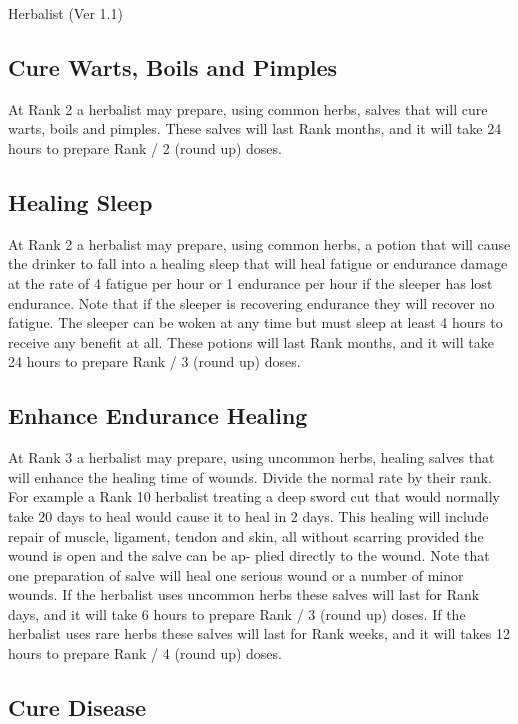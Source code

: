 \begin{Chapter}{Herbalist (Ver 1.1)}
\subsection{Cure Warts, Boils and Pimples}

At Rank 2 a herbalist may prepare, using common herbs, salves that
will cure warts, boils and pimples.  These salves will last Rank
months, and it will take 24 hours to prepare Rank / 2 (round up)
doses.

\subsection{Healing Sleep}

At Rank 2 a herbalist may prepare, using common herbs, a potion that
will cause the drinker to fall into a healing sleep that will heal
fatigue or endurance damage at the rate of 4 fatigue per hour or 1
endurance per hour if the sleeper has lost endurance.  Note that if
the sleeper is recovering endurance they will recover no fatigue.  The
sleeper can be woken at any time but must sleep at least 4 hours to
receive any benefit at all.  These potions will last Rank months, and
it will take 24 hours to prepare Rank / 3 (round up) doses.

\subsection{Enhance Endurance Healing}

At Rank 3 a herbalist may prepare, using uncommon herbs, healing
salves that will enhance the healing time of wounds. Divide the normal
rate by their rank.  For example a Rank 10 herbalist treating a deep
sword cut that would normally take 20 days to heal would cause it to
heal in 2 days.  This healing will include repair of muscle, ligament,
tendon and skin, all without scarring provided the wound is open and
the salve can be ap- plied directly to the wound. Note that one
preparation of salve will heal one serious wound or a number of minor
wounds.  If the herbalist uses uncommon herbs these salves will last
for Rank days, and it will take 6 hours to prepare Rank / 3 (round up)
doses.  If the herbalist uses rare herbs these salves will last for
Rank weeks, and it will takes 12 hours to prepare Rank / 4 (round up)
doses.

\subsection{Cure Disease}


\end{Chapter}
